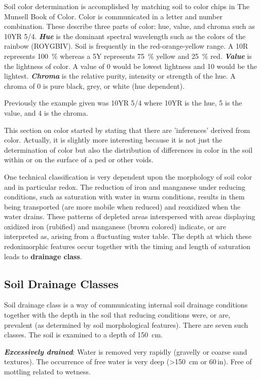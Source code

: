 \documentclass{article}
\begin{document}
Soil color determination is accomplished by matching soil to color chips in The Munsell Book of Color. Color is communicated in a letter and number combination. These describe three parts of color: hue, value, and chroma such as 10YR 5/4. \textbf{\textit{Hue}} is the dominant spectral wavelength such as the colors of the rainbow (ROYGBIV). Soil is frequently in the red-orange-yellow range. A 10R represents \qty{100}{\percent} whereas a 5Y represents \qty{75}{\percent} yellow and \qty{25}{\percent} red. \textbf{\textit{Value}} is the lightness of color. A value of 0 would be lowest lightness and 10 would be the lightest. \textbf{\textit{Chroma}} is the relative purity, intensity or strength of the hue. A chroma of 0 is pure black, grey, or white (hue dependent).

Previously the example given was 10YR 5/4 where 10YR is the hue, 5 is the value, and 4 is the chroma.
    
This section on color started by stating that there are 'inferences' derived from color. Actually, it is slightly more interesting because it is not just the determination of color but also the distribution of differences in color in the soil  within or on the surface of a ped or other voids.
 
One technical classification is very dependent upon the morphology of soil color and in particular redox. The reduction of iron and manganese under reducing conditions, such as saturation with water in warm conditions, results in them being  transported (are more mobile when reduced) and reoxidized when the water drains. These patterns of depleted areas interspersed with areas displaying oxidized iron (rubified) and manganese (brown colored) indicate, or are interpreted as, arising from a fluctuating water table. The depth at which these redoximorphic features occur together with the timing and length of saturation leads to \textbf{drainage class}.
 
\subsection{Soil Drainage Classes}
\label{drainageclasses}

Soil drainage class is a way of communicating internal soil drainage conditions together with the depth in the soil that reducing conditions were, or are, prevalent (as determined by soil morphological features). There are seven such classes. The soil is examined to a depth of \qty{150}{cm}.

\textbf{\textit{Excessively drained}}: Water is removed very rapidly (gravelly or coarse sand textures). The occurrence of free water is very deep (\textgreater{}\qty{150}{cm} or 60\,in). Free of mottling related to wetness.
\end{document}
